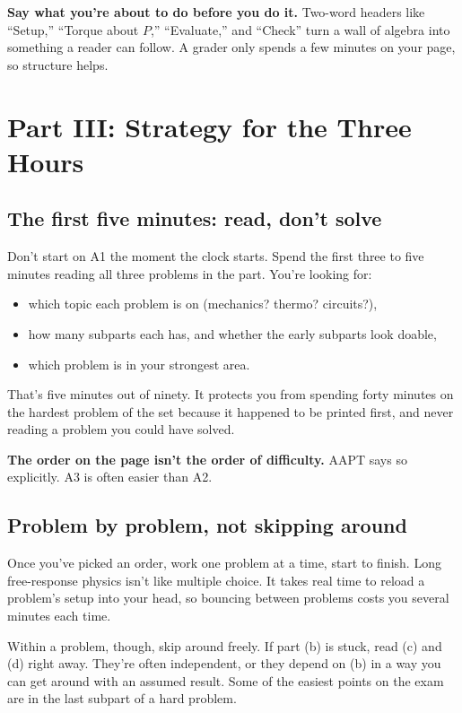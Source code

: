 \documentclass[11pt]{article}
\begin{document}
\textbf{Say what you're about to do before you do it.} Two-word headers like ``Setup,''
``Torque about $P$,'' ``Evaluate,'' and ``Check'' turn a wall of algebra into something a
reader can follow. A grader only spends a few minutes on your page, so structure helps.

\section{Part III: Strategy for the Three Hours}

\subsection*{The first five minutes: read, don't solve}

Don't start on A1 the moment the clock starts. Spend the first three to five minutes reading
all three problems in the part. You're looking for:

\begin{itemize}\setlength{\itemsep}{1pt}
\item which topic each problem is on (mechanics? thermo? circuits?),
\item how many subparts each has, and whether the early subparts look doable,
\item which problem is in your strongest area.
\end{itemize}

That's five minutes out of ninety. It protects you from spending forty minutes on the
hardest problem of the set because it happened to be printed first, and never reading a
problem you could have solved.

\begin{warnbox}
\textbf{The order on the page isn't the order of difficulty.} AAPT says so explicitly. A3
is often easier than A2.
\end{warnbox}

\subsection*{Problem by problem, not skipping around}

Once you've picked an order, work one problem at a time, start to finish. Long
free-response physics isn't like multiple choice. It takes real time to reload a problem's
setup into your head, so bouncing between problems costs you several minutes each time.

Within a problem, though, skip around freely. If part (b) is stuck, read (c) and (d) right
away. They're often independent, or they depend on (b) in a way you can get around with an
assumed result. Some of the easiest points on the exam are in the last subpart of a hard
problem.
\end{document}
